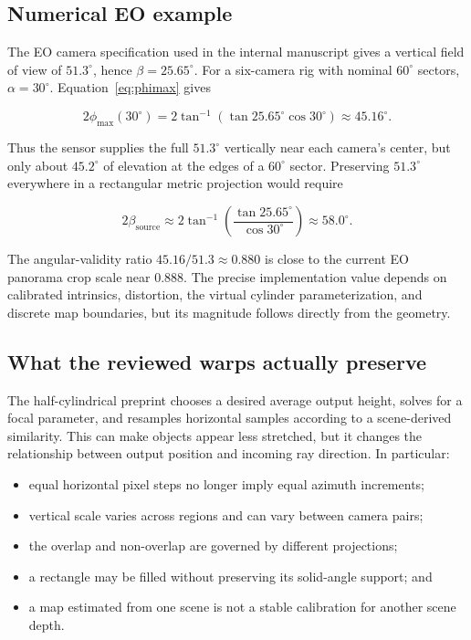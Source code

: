 \documentclass[10pt]{article}
\begin{document}
\subsection{Numerical EO example}

The EO camera specification used in the internal manuscript gives a vertical field of view of $51.3^\circ$, hence $\beta=25.65^\circ$. For a six-camera rig with nominal $60^\circ$ sectors, $\alpha=30^\circ$. Equation~\eqref{eq:phimax} gives

\begin{equation}
2\phi_{\max}(30^\circ)
=
2\tan^{-1}\!\left(\tan 25.65^\circ\cos30^\circ\right)
\approx45.16^\circ.
\end{equation}

Thus the sensor supplies the full $51.3^\circ$ vertically near each camera's center, but only about $45.2^\circ$ of elevation at the edges of a $60^\circ$ sector. Preserving $51.3^\circ$ everywhere in a rectangular metric projection would require

\begin{equation}
2\beta_{\mathrm{source}}
\approx
2\tan^{-1}\!\left(\frac{\tan25.65^\circ}{\cos30^\circ}\right)
\approx58.0^\circ.
\end{equation}

The angular-validity ratio $45.16/51.3\approx0.880$ is close to the current EO panorama crop scale near $0.888$. The precise implementation value depends on calibrated intrinsics, distortion, the virtual cylinder parameterization, and discrete map boundaries, but its magnitude follows directly from the geometry.

\subsection{What the reviewed warps actually preserve}

The half-cylindrical preprint chooses a desired average output height, solves for a focal parameter, and resamples horizontal samples according to a scene-derived similarity. This can make objects appear less stretched, but it changes the relationship between output position and incoming ray direction. In particular:

\begin{itemize}
  \item equal horizontal pixel steps no longer imply equal azimuth increments;
  \item vertical scale varies across regions and can vary between camera pairs;
  \item the overlap and non-overlap are governed by different projections;
  \item a rectangle may be filled without preserving its solid-angle support; and
  \item a map estimated from one scene is not a stable calibration for another scene depth.
\end{itemize}
\end{document}
